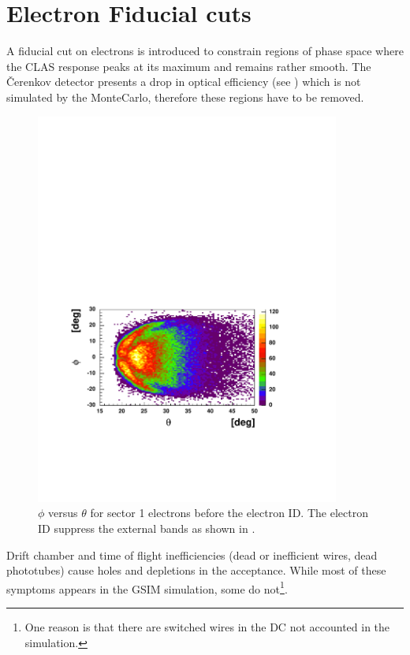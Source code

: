 \cia\vspace{-2cm}
\section{Electron Fiducial cuts} 
\label{sec:fid_e} 
A fiducial cut on electrons is introduced to constrain regions of phase space
where the CLAS response peaks at its maximum and remains rather smooth.
The \v Cerenkov detector presents a drop in optical efficiency 
(see ) which is not simulated by the MonteCarlo, therefore 
these regions have to be removed. 
\begin{figure}[h]
 \begin{center}
 \includegraphics[width = 10cm, bb=100 140 460 440]{data_reduction/img/electron_before_id} 
  \caption[$\phi$ versus $\theta$ for sector 1 electrons before the electron ID]
          { $\phi$ versus $\theta$ for sector 1 electrons before the electron ID. 
                     The electron ID suppress the external bands as shown in .}
 \label{fig:optical_drop}
 \end{center}
\end{figure}
Drift chamber and time of flight inefficiencies (dead or inefficient wires, dead phototubes)
cause holes and depletions in the acceptance. While most of these symptoms appears in 
the GSIM simulation, some do not\footnote{One reason is that there are switched
wires in the DC not accounted in the simulation.}. 

